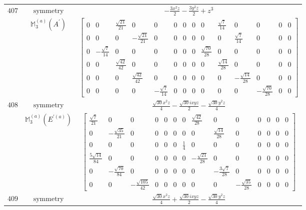 \documentclass[fleqn,8pt,landscape]{jsarticle}
\begin{document}
\begin{longtable}{ccc}
$ 407 $ & $ \text{symmetry} $ & $ - \frac{3 x^{2} z}{2} - \frac{3 y^{2} z}{2} + z^{3} $ \\
$  $ & $ \mathbb{M}_{3}^{(a)}(A^{\prime}) $ & $ \begin{bmatrix} 0 & 0 & \frac{\sqrt{21}}{21} & 0 & 0 & 0 & 0 & 0 & 0 & \frac{\sqrt{7}}{14} & 0 & 0 & 0 & 0 \\ 0 & 0 & 0 & - \frac{\sqrt{21}}{21} & 0 & 0 & 0 & 0 & 0 & 0 & \frac{\sqrt{7}}{14} & 0 & 0 & 0 \\ 0 & - \frac{\sqrt{7}}{14} & 0 & 0 & 0 & 0 & 0 & 0 & \frac{\sqrt{70}}{28} & 0 & 0 & 0 & 0 & 0 \\ 0 & 0 & \frac{\sqrt{42}}{42} & 0 & 0 & 0 & 0 & 0 & 0 & \frac{\sqrt{14}}{28} & 0 & 0 & 0 & 0 \\ 0 & 0 & 0 & \frac{\sqrt{42}}{42} & 0 & 0 & 0 & 0 & 0 & 0 & - \frac{\sqrt{14}}{28} & 0 & 0 & 0 \\ 0 & 0 & 0 & 0 & - \frac{\sqrt{7}}{14} & 0 & 0 & 0 & 0 & 0 & 0 & - \frac{\sqrt{70}}{28} & 0 & 0 \end{bmatrix} $ \\ \hline
$ 408 $ & $ \text{symmetry} $ & $ \frac{\sqrt{30} x^{2} z}{4} - \frac{\sqrt{30} i x y z}{2} - \frac{\sqrt{30} y^{2} z}{4} $ \\
$  $ & $ \mathbb{M}_{3}^{(a)}(E^{\prime(a)}) $ & $ \begin{bmatrix} \frac{\sqrt{7}}{21} & 0 & 0 & 0 & 0 & 0 & 0 & \frac{\sqrt{42}}{28} & 0 & 0 & 0 & 0 & 0 & 0 \\ 0 & - \frac{\sqrt{35}}{21} & 0 & 0 & 0 & 0 & 0 & 0 & \frac{\sqrt{14}}{28} & 0 & 0 & 0 & 0 & 0 \\ 0 & 0 & 0 & 0 & 0 & 0 & \frac{1}{4} & 0 & 0 & 0 & 0 & 0 & 0 & 0 \\ \frac{5 \sqrt{14}}{84} & 0 & 0 & 0 & 0 & 0 & 0 & - \frac{\sqrt{21}}{28} & 0 & 0 & 0 & 0 & 0 & 0 \\ 0 & - \frac{\sqrt{70}}{84} & 0 & 0 & 0 & 0 & 0 & 0 & - \frac{3 \sqrt{7}}{28} & 0 & 0 & 0 & 0 & 0 \\ 0 & 0 & - \frac{\sqrt{105}}{42} & 0 & 0 & 0 & 0 & 0 & 0 & - \frac{\sqrt{35}}{28} & 0 & 0 & 0 & 0 \end{bmatrix} $ \\ \hline
$ 409 $ & $ \text{symmetry} $ & $ \frac{\sqrt{30} x^{2} z}{4} + \frac{\sqrt{30} i x y z}{2} - \frac{\sqrt{30} y^{2} z}{4} $ \\

\end{longtable}
\end{document}
